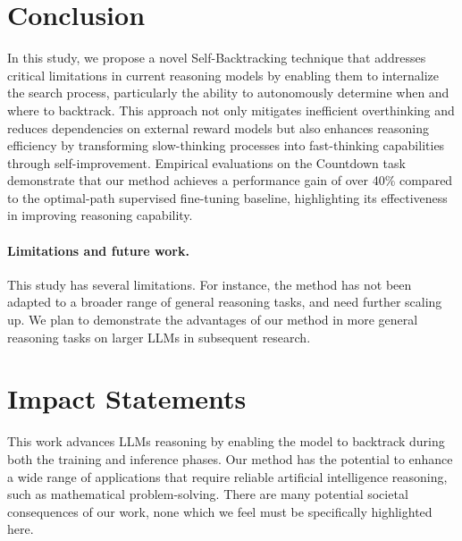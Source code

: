 \documentclass{article}
\theoremstyle{plain}
\theoremstyle{definition}
\theoremstyle{remark}
\begin{document}
\section{Conclusion}
In this study, we propose a novel Self-Backtracking technique that addresses critical limitations in current reasoning models by enabling them to internalize the search process, particularly the ability to autonomously determine when and where to backtrack. This approach not only mitigates inefficient overthinking and reduces dependencies on external reward models but also enhances reasoning efficiency by transforming slow-thinking processes into fast-thinking capabilities through self-improvement. Empirical evaluations on the Countdown task demonstrate that our method achieves a performance gain of over 40\% compared to the optimal-path supervised fine-tuning baseline, highlighting its effectiveness in improving reasoning capability. 


\paragraph{Limitations and future work.}
This study has several limitations. For instance, the method has not been adapted to a broader range of general reasoning tasks, and need further scaling up. We plan to demonstrate the advantages of our method in more general reasoning tasks on larger LLMs in subsequent research.

\section{Impact Statements}
This work advances LLMs reasoning by enabling the model to backtrack during both the training and inference phases. Our method has the potential to enhance a wide range of applications that require reliable artificial intelligence reasoning, such as mathematical problem-solving. There are many potential societal consequences of our work, none which we feel must be specifically highlighted here.




\appendix
\onecolumn
\end{document}
